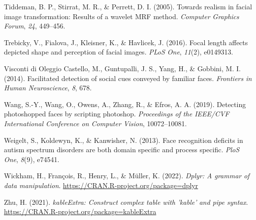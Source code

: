 \documentclass[
  doc,floatsintext]{apa6}
\newlength{\cslhangindent}
\newlength{\cslentryspacingunit} %
\newenvironment{CSLReferences}[2] %
 {%
  \setlength{\parindent}{0pt}
  \ifodd #1
  \let\oldpar\par
  \def\par{\hangindent=\cslhangindent\oldpar}
  \fi
  \setlength{\parskip}{#2\cslentryspacingunit}
 }%
 {}
\begin{document}
\begin{CSLReferences}{1}{0}
\leavevmode{}%
Tiddeman, B. P., Stirrat, M. R., \& Perrett, D. I. (2005). Towards realism in facial image transformation: Results of a wavelet MRF method. \emph{Computer Graphics Forum}, \emph{24}, 449--456.

\leavevmode{}%
Trebicky, V., Fialova, J., Kleisner, K., \& Havlicek, J. (2016). Focal length affects depicted shape and perception of facial images. \emph{PLoS One}, \emph{11}(2), e0149313.

\leavevmode{}%
Visconti di Oleggio Castello, M., Guntupalli, J. S., Yang, H., \& Gobbini, M. I. (2014). Facilitated detection of social cues conveyed by familiar faces. \emph{Frontiers in Human Neuroscience}, \emph{8}, 678.

\leavevmode{}%
Wang, S.-Y., Wang, O., Owens, A., Zhang, R., \& Efros, A. A. (2019). Detecting photoshopped faces by scripting photoshop. \emph{Proceedings of the IEEE/CVF International Conference on Computer Vision}, 10072--10081.

\leavevmode{}%
Weigelt, S., Koldewyn, K., \& Kanwisher, N. (2013). Face recognition deficits in autism spectrum disorders are both domain specific and process specific. \emph{PloS One}, \emph{8}(9), e74541.

\leavevmode{}%
Wickham, H., François, R., Henry, L., \& Müller, K. (2022). \emph{Dplyr: A grammar of data manipulation}. \url{https://CRAN.R-project.org/package=dplyr}

\leavevmode{}%
Zhu, H. (2021). \emph{kableExtra: Construct complex table with 'kable' and pipe syntax}. \url{https://CRAN.R-project.org/package=kableExtra}

\end{CSLReferences}

\endgroup
\end{document}
